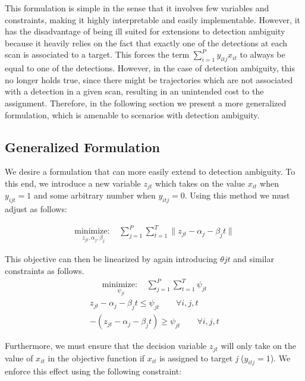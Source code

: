 This formulation is simple in the sense that it involves few variables and constraints, making it highly interpretable and easily implementable. However, it has the disadvantage of being ill suited for extensions to detection ambiguity because it heavily relies on the fact that exactly one of the detections at each scan is associated to a target. This forces the term $\sum_{i=1}^{P}y_{itj}x_{it}$ to always be equal to one of the detections. However, in the case of detection ambiguity, this no longer holds true, since there might be trajectories which are not associated with a detection in a given scan, resulting in an unintended cost to the assignment. Therefore, in the following section we present a more generalized formulation, which is amenable to scenarios with detection ambiguity.

\subsection{Generalized Formulation}
We desire a formulation that can more easily extend to detection ambiguity. To this end, we introduce a new variable $z_{jt}$ which takes on the value $x_{it}$ when $y_{ijt}=1$ and some arbitrary number when $y_{itj}=0$. Using this method we must adjust \label{eq:simple_objective} as follows:

\begin{align}\label{eq:generalized_objective}
\underset{z_{jt}, \alpha_{j}, \beta_{j}}{\text{minimize: }} & \sum_{j=1}^{P} \sum_{t=1}^{T} \|z_{jt} - \alpha_{j} - \beta_{j}t\|
\end{align}

This objective can then be linearized by again introducing $\theta{jt}$ and similar constraints as follows. 
\begin{align}\label{eq:generalized_linear_objective}
\underset{\psi_{jt}}{\text{minimize: }} & \sum_{j=1}^{P} \sum_{t=1}^{T} \psi_{jt}
\end{align}
\begin{align}
z_{jt} - \alpha_{j} - \beta_{j}t \leq \psi_{jt} \qquad \forall i,j,t\\
-(z_{jt} - \alpha_{j} - \beta_{j}t) \geq \psi_{jt} \qquad \forall i,j,t
\end{align}
 
Furthermore, we must ensure that the decision variable $z_{jt}$ will only take on the value of $x_{it}$ in the objective function if $x_{it}$ is assigned to target \textit{j} ($y_{itj} = 1$). We enforce this effect using the following constraint:

